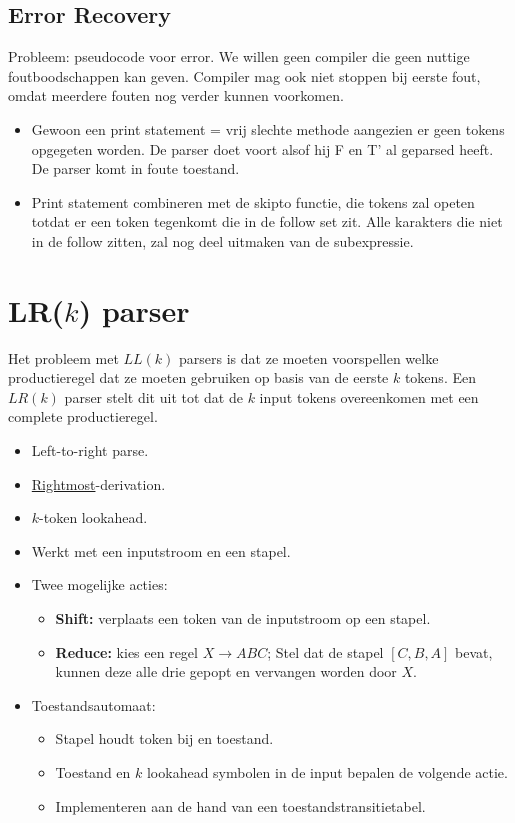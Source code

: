 \subsection{Error Recovery}
Probleem: pseudocode voor error. We willen geen compiler die geen nuttige foutboodschappen kan geven. Compiler mag ook niet stoppen bij eerste fout, omdat meerdere fouten nog verder kunnen voorkomen.
\begin{itemize}
	\item Gewoon een print statement = vrij slechte methode aangezien er geen tokens opgegeten worden. De parser doet voort alsof hij F en T' al geparsed heeft. De parser komt in foute toestand.
	\item Print statement combineren met de skipto functie, die tokens zal opeten totdat er een token tegenkomt die in de follow set zit. Alle karakters die niet in de follow zitten, zal nog deel uitmaken van de subexpressie. 
\end{itemize}

\section{LR($k$) parser}
Het probleem met $LL(k)$ parsers is dat ze moeten voorspellen welke productieregel dat ze moeten gebruiken op basis van de eerste $k$ tokens. Een $LR(k)$ parser stelt dit uit tot dat de $k$ input tokens overeenkomen met een complete productieregel.
\begin{itemize}
	\item Left-to-right parse.
	\item \underline{Rightmost}-derivation.
	\item $k$-token lookahead.
	\item Werkt met een inputstroom en een stapel.
	\item Twee mogelijke acties:
	\begin{itemize}
		\item \textbf{Shift:} verplaats een token van de inputstroom op een stapel.
		\item \textbf{Reduce:} kies een regel $X \rightarrow A B C$; Stel dat de stapel $[C, B, A]$ bevat, kunnen deze alle drie gepopt en vervangen worden door $X$.
	\end{itemize}
	\item Toestandsautomaat:
	\begin{itemize}
		\item Stapel houdt token bij en toestand.
		\item Toestand en $k$ lookahead symbolen in de input bepalen de volgende actie.
		\item Implementeren aan de hand van een toestandstransitietabel.
	\end{itemize}
\end{itemize}



